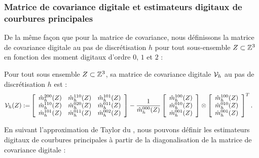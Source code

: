 \subsubsection{Matrice de covariance digitale et estimateurs digitaux de courbures principales}
%
De la même façon que pour la matrice de covariance, nous définissons la matrice
de covariance digitale au pas de discrétisation $h$ pour tout sous-ensemble
$Z \subset \mathbb{Z}^3$ en fonction des moment digitaux d'ordre $0$, $1$ et $2$ :
%
\begin{definition}{} \label{def:DigCovMatrix-def}
%
  Pour tout sous ensemble $Z \subset \mathbb{Z}^3$, sa matrice de covariance
  digitale $\mathcal{V}_{h}$ au pas de discrétisation $h$ est :
%
  \begin{align}
%
    \DCov{h}(Z) \EqDef &\left\lbrack
        \begin{array}{ccc}
          \DMom{200}{h}(\DigShape) & \DMom{110}{h}(\DigShape) & \DMom{101}{h}(\DigShape)\\
          \DMom{110}{h}(\DigShape) & \DMom{020}{h}(\DigShape) & \DMom{011}{h}(\DigShape)\\
          \DMom{101}{h}(\DigShape) & \DMom{011}{h}(\DigShape) & \DMom{002}{h}(\DigShape)
        \end{array}
        \right\rbrack
        - \frac{1}{\DMom{000}{h}(\DigShape)}
        \left\lbrack
        \begin{array}{c}
          \DMom{100}{h}(\DigShape) \\
          \DMom{010}{h}(\DigShape) \\
          \DMom{001}{h}(\DigShape) \\
        \end{array}
        \right\rbrack
        \otimes
        \left\lbrack
        \begin{array}{c}
          \DMom{100}{h}(\DigShape) \\
          \DMom{010}{h}(\DigShape) \\
          \DMom{001}{h}(\DigShape) \\
        \end{array}
        \right\rbrack^T.
%
  \end{align}
%
\end{definition}
%
En suivant l'approximation de Taylor du , nous pouvons
définir les estimateurs digitaux de courbures principales à partir de la
diagonalisation de la matrice de covariance digitale :
%
